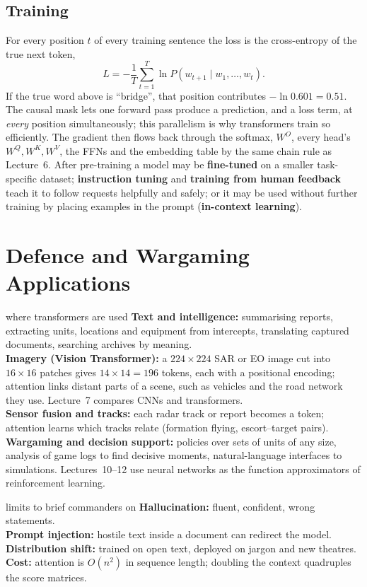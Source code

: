 \documentclass[11pt]{article}
\begin{document}
\subsection{Training}
For every position $t$ of every training sentence the loss is the cross-entropy of the true next token,
\[L=-\frac1T\sum_{t=1}^{T}\ln P(w_{t+1}\mid w_1,\dots,w_t).\]
If the true word above is ``bridge'', that position contributes $-\ln0.601=0.51$. The causal mask lets one forward pass produce a prediction, and a loss term, at \emph{every} position simultaneously; this parallelism is why transformers train so efficiently. The gradient then flows back through the softmax, $W^O$, every head's $W^Q,W^K,W^V$, the FFNs and the embedding table by the same chain rule as Lecture~6. After pre-training a model may be \textbf{fine-tuned} on a smaller task-specific dataset; \textbf{instruction tuning} and \textbf{training from human feedback} teach it to follow requests helpfully and safely; or it may be used without further training by placing examples in the prompt (\textbf{in-context learning}).

\section{Defence and Wargaming Applications}
\begin{defence}{where transformers are used}
\textbf{Text and intelligence:} summarising reports, extracting units, locations and equipment from intercepts, translating captured documents, searching archives by meaning.\\
\textbf{Imagery (Vision Transformer):} a $224\times224$ SAR or EO image cut into $16\times16$ patches gives $14\times14=196$ tokens, each with a positional encoding; attention links distant parts of a scene, such as vehicles and the road network they use. Lecture~7 compares CNNs and transformers.\\
\textbf{Sensor fusion and tracks:} each radar track or report becomes a token; attention learns which tracks relate (formation flying, escort--target pairs).\\
\textbf{Wargaming and decision support:} policies over sets of units of any size, analysis of game logs to find decisive moments, natural-language interfaces to simulations. Lectures~10--12 use neural networks as the function approximators of reinforcement learning.
\end{defence}
\begin{pitfall}{limits to brief commanders on}
\textbf{Hallucination:} fluent, confident, wrong statements.\\
\textbf{Prompt injection:} hostile text inside a document can redirect the model.\\
\textbf{Distribution shift:} trained on open text, deployed on jargon and new theatres.\\
\textbf{Cost:} attention is $O(n^2)$ in sequence length; doubling the context quadruples the score matrices.
\end{pitfall}
\end{document}
